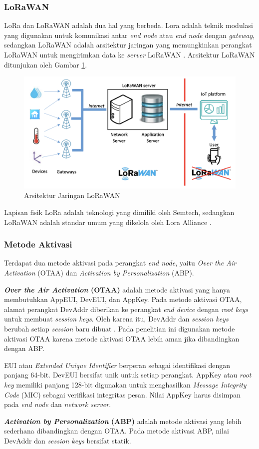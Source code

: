 \subsubsection{LoRaWAN}
LoRa dan LoRaWAN adalah dua hal yang berbeda. Lora adalah teknik modulasi yang digunakan untuk komunikasi antar \textit{end node} atau \textit{end node} dengan \textit{gateway}, sedangkan LoRaWAN adalah arsitektur jaringan yang memungkinkan perangkat LoRaWAN untuk mengirimkan data ke \textit{server} LoRaWAN \cite{Zhou2019}. Arsitektur LoRaWAN ditunjukan oleh Gambar \ref{Fig: lorawan-architecure}.
\begin{figure}[ht]
	\centering
	\includegraphics[width=13cm]{contents/chapter-2/lorawan-architecture.png}
	\caption{Arsitektur Jaringan LoRaWAN \cite{Montagny2022}}
	\label{Fig: lorawan-architecure}
\end{figure}

Lapisan fisik LoRa adalah teknologi yang dimiliki oleh Semtech, sedangkan LoRaWAN adalah standar umum yang dikelola oleh Lora Alliance \cite{Augustin2016}. 

\subsubsection{Metode Aktivasi}
Terdapat dua metode aktivasi pada perangkat \textit{end node}, yaitu \textit{Over the Air Activation} (OTAA) dan \textit{Activation by Personalization} (ABP).

\textbf{\textit{Over the Air Activation} (OTAA)} adalah metode aktivasi yang hanya membutuhkan AppEUI, DevEUI, dan AppKey. Pada metode aktivasi OTAA, alamat perangkat DevAddr diberikan ke perangkat \textit{end device} dengan \textit{root keys} untuk membuat \textit{session keys}. Oleh karena itu, DevAddr dan \textit{session keys} berubah setiap \textit{session} baru dibuat \cite{LoRa2017}. Pada penelitian ini digunakan metode aktivasi OTAA karena metode aktivasi OTAA lebih aman jika dibandingkan dengan ABP.

EUI atau \textit{Extended Unique Identifier} berperan sebagai identifikasi dengan panjang 64-bit. DevEUI bersifat unik untuk setiap perangkat. AppKey atau \textit{root key} memiliki panjang 128-bit digunakan untuk menghasilkan \textit{Message Integrity Code} (MIC) sebagai verifikasi integritas pesan. Nilai AppKey harus disimpan pada \textit{end node} dan \textit{network server}.

\textbf{\textit{Activation by Personalization} (ABP)} adalah metode aktivasi yang lebih sederhana dibandingkan dengan OTAA. Pada metode aktivasi ABP, nilai DevAddr dan \textit{session keys} bersifat statik.
\fi